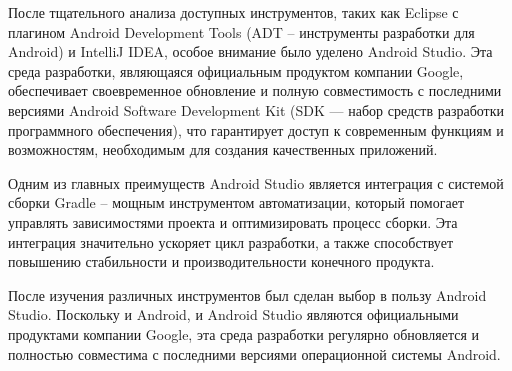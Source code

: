 После тщательного анализа доступных инструментов, таких как Eclipse с плагином Android Development Tools (ADT -- инструменты разработки для Android) и IntelliJ IDEA, особое внимание было уделено Android Studio\cite{kocakoyun2017developing}. Эта среда разработки, являющаяся официальным продуктом компании Google, обеспечивает своевременное обновление и полную совместимость с последними версиями Android Software Development Kit (SDK — набор средств разработки программного обеспечения), что гарантирует доступ к современным функциям и возможностям, необходимым для создания качественных приложений.

Одним из главных преимуществ Android Studio является интеграция с системой сборки Gradle -- мощным инструментом автоматизации, который помогает управлять зависимостями проекта и оптимизировать процесс сборки. Эта интеграция значительно ускоряет цикл разработки, а также способствует повышению стабильности и производительности конечного продукта\cite{craig2015learn}.

После изучения различных инструментов был сделан выбор в пользу Android Studio\cite{zapata2016android}. Поскольку и Android, и Android Studio являются официальными продуктами компании Google, эта среда разработки регулярно обновляется и полностью совместима с последними версиями операционной системы Android.